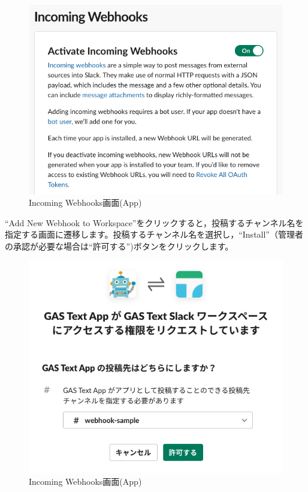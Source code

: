 \documentclass[uplatex,a4j]{jsarticle}
\begin{document}
\begin{figure}[H]
 \centering
 \includegraphics[keepaspectratio, scale=0.6]{images/create_new_app4.png}
 \caption{Incoming Webhooks画面(App)}
 \label{fig:create_new_app4}
\end{figure}

``Add New Webhook to Workspace''をクリックすると，投稿するチャンネル名を指定する画面に遷移します。投稿するチャンネル名を選択し，``Install''（管理者の承認が必要な場合は``許可する'')ボタンをクリックします。

\begin{figure}[H]
 \centering
 \includegraphics[keepaspectratio, scale=0.6]{images/create_incoming_webhooks.png}
 \caption{Incoming Webhooks画面(App)}
 \label{fig:request_install_app}
\end{figure}
\end{document}
